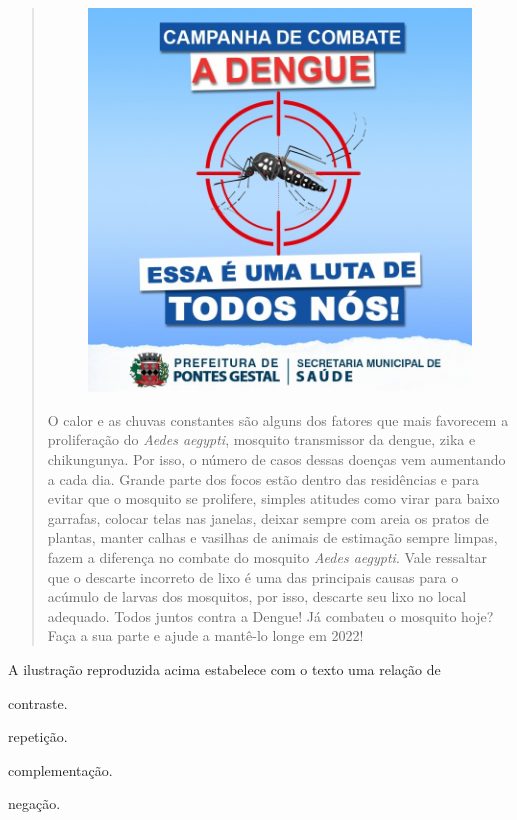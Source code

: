\begin{quote}
\begin{figure}
\includegraphics[width=.5\textwidth]{./imgQ4PORT/media/image3.jpeg}
\end{figure}

O calor e as chuvas constantes são alguns dos fatores que mais
favorecem a proliferação do \textit{Aedes aegypti}, mosquito transmissor da
dengue, zika e chikungunya. Por isso, o número de casos dessas doenças
vem aumentando a cada dia. Grande parte dos focos estão dentro das
residências e para evitar que o mosquito se prolifere, simples atitudes
como virar para baixo garrafas, colocar telas nas janelas, deixar sempre
com areia os pratos de plantas, manter calhas e vasilhas de animais de
estimação sempre limpas, fazem a diferença no combate do mosquito 
\textit{Aedes aegypti}. Vale ressaltar que o descarte incorreto de 
lixo é uma das principais causas para o acúmulo de larvas dos mosquitos,
por isso, descarte seu lixo no local adequado. Todos juntos contra a
Dengue! Já combateu o mosquito hoje? Faça a sua parte e ajude a mantê-lo
longe em 2022!

\end{quote}

A ilustração reproduzida acima estabelece com o texto uma relação de

\begin{multicols}{2}
\begin{escolha}

  \item contraste.

  \item repetição.

  \item complementação.

  \item negação.

\end{escolha}
\end{multicols}

